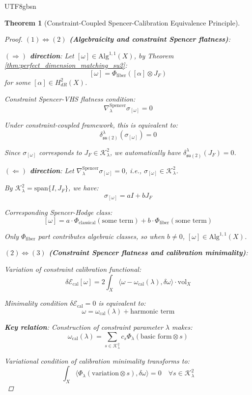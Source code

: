 \documentclass[a4paper,12pt]{extarticle}
\newtheorem{theorem}{Theorem}[section]
\theoremstyle{definition}
\begin{document}
\begin{CJK}{UTF8}{gbsn}
\begin{theorem}[Constraint-Coupled Spencer-Calibration Equivalence Principle]
\begin{proof}
\textbf{$(1) \Leftrightarrow (2)$ (Algebraicity and constraint Spencer flatness)}:

\textbf{$(\Rightarrow)$ direction}:
Let $[\omega] \in \text{Alg}^{1,1}(X)$, by Theorem \ref{thm:perfect_dimension_matching_su2}:
$$[\omega] = \Phi_{\text{fiber}}([\alpha] \otimes J_F)$$
for some $[\alpha] \in H^2_{dR}(X)$.

Constraint Spencer-VHS flatness condition:
$$\nabla^{\text{Spencer}}_\lambda \sigma_{[\omega]} = 0$$

Under constraint-coupled framework, this is equivalent to:
$$\delta^\lambda_{\mathfrak{su}(2)}(\sigma_{[\omega]}) = 0$$

Since $\sigma_{[\omega]}$ corresponds to $J_F \in \mathcal{K}^2_\lambda$, we automatically have $\delta^\lambda_{\mathfrak{su}(2)}(J_F) = 0$.

\textbf{$(\Leftarrow)$ direction}:
Let $\nabla^{\text{Spencer}}_\lambda \sigma_{[\omega]} = 0$, i.e., $\sigma_{[\omega]} \in \mathcal{K}^2_\lambda$.

By $\mathcal{K}^2_\lambda = \text{span}\{I, J_F\}$, we have:
$$\sigma_{[\omega]} = aI + bJ_F$$

Corresponding Spencer-Hodge class:
$$[\omega] = a \cdot \Phi_{\text{classical}}(\text{some term}) + b \cdot \Phi_{\text{fiber}}(\text{some term})$$

Only $\Phi_{\text{fiber}}$ part contributes algebraic classes, so when $b \neq 0$, $[\omega] \in \text{Alg}^{1,1}(X)$.

\textbf{$(2) \Leftrightarrow (3)$ (Constraint Spencer flatness and calibration minimality)}:

Variation of constraint calibration functional:
$$\delta \mathcal{E}_{\text{cal}}[\omega] = 2\int_X \langle \omega - \omega_{\text{cal}}(\lambda), \delta\omega \rangle \cdot \text{vol}_X$$

Minimality condition $\delta \mathcal{E}_{\text{cal}} = 0$ is equivalent to:
$$\omega = \omega_{\text{cal}}(\lambda) + \text{harmonic term}$$

\textbf{Key relation}: Construction of constraint parameter $\lambda$ makes:
$$\omega_{\text{cal}}(\lambda) = \sum_{s \in \mathcal{K}^2_\lambda} c_s \Phi_\lambda(\text{basic form} \otimes s)$$

Variational condition of calibration minimality transforms to:
$$\int_X \langle \Phi_\lambda(\text{variation} \otimes s), \delta\omega \rangle = 0 \quad \forall s \in \mathcal{K}^2_\lambda$$


\end{proof}
\end{theorem}
\end{CJK}
\end{document}
